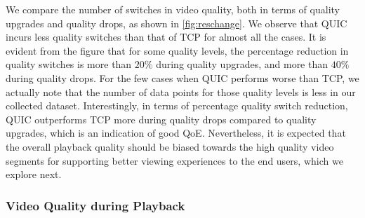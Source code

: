We compare the number of switches in video quality, both in terms of quality upgrades and quality drops, as shown in \fig\ref{fig:reschange}.
We observe that QUIC incurs less quality switches than that of TCP for almost all the cases. 
It is evident from the figure that for some quality levels, the percentage reduction in quality switches is more than $20\%$ during quality upgrades, and more than $40\%$ during quality drops. For the few cases when QUIC performs worse than TCP, we actually note that the number of data points for those quality levels is less in our collected dataset. Interestingly, in terms of percentage quality switch reduction, QUIC outperforms TCP  more during quality drops compared to quality upgrades, which is an indication of good QoE.  Nevertheless, it is expected that the overall playback quality should be biased towards the high quality video segments for supporting better viewing experiences to the end users, which we explore next. 

\subsubsection{Video Quality during Playback}

